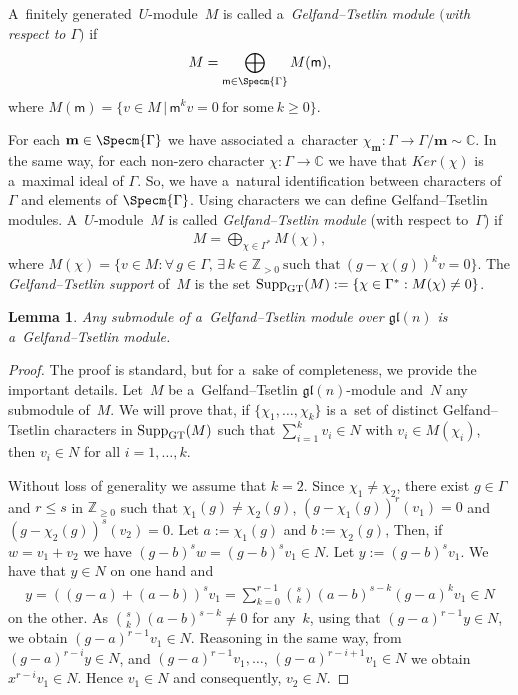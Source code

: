\documentclass[pdftex]{sigma}
\DeclareMathOperator\Supp{Supp} \DeclareMathOperator\codim{codim} \DeclareMathOperator\Y{Y}
\numberwithin{equation}{section}
\newtheorem{Lemma}[Theorem]{Lemma}
\begin{document}
\begin{Definition}
A~f\/initely generated~$U$-module~$M$ is called a~\emph{Gelfand--Tsetlin module $($with respect to ${\Gamma})$} if
\begin{gather*}
M=\bigoplus_{\mathsf m\in\Specm{\Gamma}}M(\mathsf m),
\end{gather*}
where $M(\mathsf m)=\{v\in M\,|\, \mathsf m^{k}v=0~\text{for some}~k\geq 0\}$.
\end{Definition}

For each $\mathbf m\in\Specm{\Gamma}$ we have associated a~character $\chi_{\mathbf m}:{\Gamma}\rightarrow{\Gamma}/\mathbf
m\sim\mathbb{C}$.
In the same way, for each non-zero character $\chi:{\Gamma}\rightarrow\mathbb{C}$ we have that $Ker(\chi)$ is a~maximal
ideal of ${\Gamma}$.
So, we have a~natural identif\/ication between characters of ${\Gamma}$ and elements of $\Specm{\Gamma}$.
Using characters we can def\/ine Gelfand--Tsetlin modules.
A~$U$-module~$M$ is called \emph{Gelfand--Tsetlin module} (with respect to~$\Gamma$) if
\begin{gather*}
M=\bigoplus_{\chi\in\Gamma^{*}}M(\chi),
\end{gather*}
where $M(\chi)=\{v\in M: \forall\, g\in\Gamma, \, \exists\, k\in\mathbb{Z}_{>0}~\text{such that}~(g-\chi(g))^{k}v=0 \}$.
The {\it Gelfand--Tsetlin support} of~$M$ is the set $\Supp_{\rm GT}(M):=\{\chi\in{\Gamma}^{*}:M(\chi)\neq 0\}$.

\begin{Lemma}
\label{lemma elements of Gamma separates tableaux}
Any submodule of a~Gelfand--Tsetlin module over $\mathfrak{gl}(n)$ is a~Gelfand--Tsetlin mo\-dule.
\end{Lemma}

\begin{proof}
The proof is standard, but for a~sake of completeness, we provide the important details.
Let~$M$ be a~Gelfand--Tsetlin $\mathfrak{gl}(n)$-module and~$N$ any submodule of~$M$.
We will prove that, if $\{\chi_{1},\dots,\chi_{k} \}$ is a~set of distinct Gelfand--Tsetlin characters in
$\Supp_{\rm GT}(M)$ such that $\sum\limits_{i=1}^{k}v_{i}\in N$ with $v_{i}\in M(\chi_{i})$, then $v_{i}\in N$ for all
$i=1,\ldots,k$.

Without loss of generality we assume that $k=2$.
Since $\chi_{1}\neq\chi_{2}$, there exist $g\in\Gamma$ and $r\leq s$ in $\mathbb{Z}_{\geq 0}$ such that
$\chi_{1}(g)\neq\chi_{2}(g)$, $(g-\chi_{1}(g))^{r}(v_{1})=0$ and $(g-\chi_{2}(g))^{s}(v_{2})=0$.
Let $a:=\chi_{1}(g)$ and $b:= \chi_{2}(g)$, Then, if $w=v_{1}+v_{2}$ we have $(g-b)^{s}w=(g-b)^{s}v_{1}\in N$.
Let $y:= (g-b)^sv_1$.
We have that $y \in N$ on one hand and
\begin{gather*}
y=((g-a)+(a-b))^{s}v_{1}=\sum\limits_{k=0}^{r-1} {s\choose k}(a-b)^{s-k}(g-a)^{k}v_{1}\in N
\end{gather*}
on the other.
As ${s\choose k}(a-b)^{s-k}\neq 0$ for any~$k$, using that $(g-a)^{r-1}y\in N$, we obtain \mbox{$(g-a)^{r-1}v_1\in N$}.
Reasoning in the same way, from $(g-a)^{r-i}y\in N$, and $(g-a)^{r-1}v_{1},\ldots$, $(g-a)^{r-i+1}v_{1}\in N $ we obtain $
x^{r-i}v_{1}\in N$.
Hence $v_{1}\in N$ and consequently, $v_{2}\in N$.
\end{proof}
\end{document}
